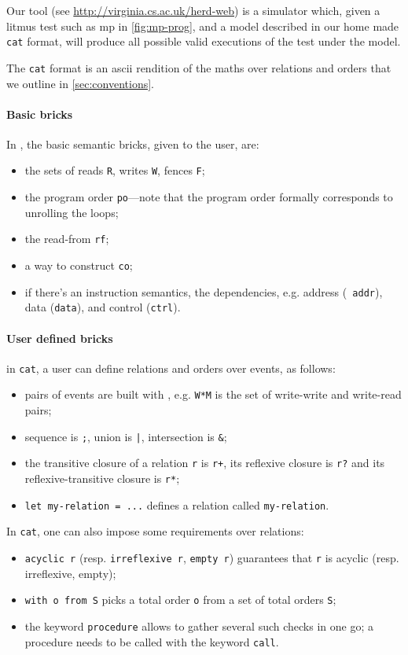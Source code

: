 \documentclass[a4paper]{article}
\begin{document}
Our  tool (see \url{http://virginia.cs.ac.uk/herd-web}) is a
simulator which, given a litmus test such as \textsf{mp} in
\myfig\ref{fig:mp-prog}, and a model described in our home made {\tt cat}
format, will produce all possible valid executions of the test under the model.

The {\tt cat} format is an ascii rendition of the maths over relations and
orders that we outline in \mysec\ref{sec:conventions}. 

{\color{blue} 
\paragraph{Basic bricks}

In , the basic semantic bricks, given to the user, are:
\begin{itemize}
\item the sets of reads {\tt R}, writes {\tt W}, fences {\tt F};
\item the program order {\tt po}---note that the program order formally
corresponds to unrolling the loops;
\item the read-from {\tt rf};
\item a way to construct {\tt co};
\item if there's an instruction semantics, the dependencies, e.g. address ({\tt
addr}), data ({\tt data}), and control ({\tt ctrl}).
\end{itemize}

\paragraph{User defined bricks}
}

{\color{blue}{Furthermore}} in {\tt cat}, a user can define relations and orders
over events, as follows:
\begin{itemize}
\item pairs of events are built with {\tt *}, e.g. {\tt W*M} is the set of
write-write and write-read pairs;
\item sequence is {\tt ;}, union is {\tt |}, intersection is {\tt \&};
\item the transitive closure of a relation {\tt r} is {\tt r+}, its reflexive closure is {\tt r?} and its reflexive-transitive closure is {\tt r*};
\item {\tt let my-relation = ...} defines a relation called {\tt my-relation}.
\end{itemize}

In {\tt cat}, one can also impose some requirements over relations:
\begin{itemize}
\item {\tt acyclic r} (resp. {\tt irreflexive r}, {\tt empty r}) guarantees
that {\tt r} is acyclic (resp. irreflexive, empty);
\item {\tt with o from S} picks a total order {\tt o} from a set of total
orders {\tt S};
\item the keyword {\tt procedure} allows to gather several such checks in one
go; a procedure needs to be called with the keyword {\tt call}.
\end{itemize}
\end{document}
